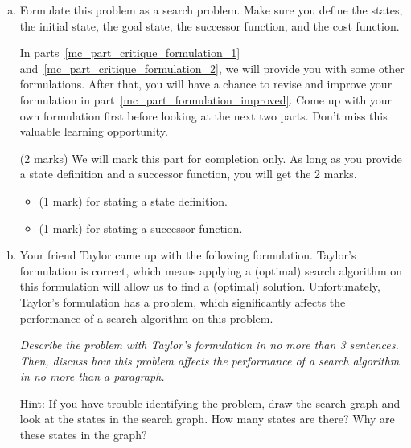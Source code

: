 \documentclass[12pt]{article}
\begin{document}
\begin{enumerate}[(a)]

\item
\label{mc_part_formulation}
Formulate this problem as a search problem. Make sure you define the states, the initial state, the goal state, the successor function, and the cost function.

In parts~\ref{mc_part_critique_formulation_1} and~\ref{mc_part_critique_formulation_2}, we will provide you with some other formulations. After that, you will have a chance to revise and improve your formulation in part~\ref{mc_part_formulation_improved}. Come up with your own formulation first before looking at the next two parts. Don't miss this valuable learning opportunity.

\begin{markscheme}
(2 marks) We will mark this part for completion only. As long as you provide a state definition and a successor function, you will get the 2 marks.
\begin{itemize}
\item
(1 mark) for stating a state definition.
\item
(1 mark) for stating a successor function.
\end{itemize}
\end{markscheme}



\item
\label{mc_part_critique_formulation_1}
Your friend Taylor came up with the following formulation. Taylor's formulation is correct, which means applying a (optimal) search algorithm on this formulation will allow us to find a (optimal) solution. Unfortunately, Taylor's formulation has a problem, which significantly affects the performance of a search algorithm on this problem. 

{\em Describe the problem with Taylor's formulation in no more than 3 sentences. Then, discuss how this problem affects the performance of a search algorithm in no more than a paragraph.}

Hint: If you have trouble identifying the problem, draw the search graph and look at the states in the search graph. How many states are there? Why are these states in the graph?


\end{enumerate}
\end{document}
